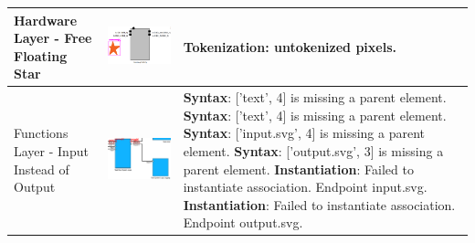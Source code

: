\begin{longtable}{p{} >{\raggedright\arraybackslash}m{} >{\raggedright\arraybackslash}m{}}
    \midrule
    Hardware Layer - Free Floating Star & \includegraphics[width=1\linewidth]{pictures/43_free_floating_star_output_clip.png} & \textbf{Tokenization}: untokenized pixels. \\
    \midrule
    Functions Layer - Input Instead of Output & \includegraphics[width=1\linewidth]{pictures/50_input_instead_of_output_output_clip.png} & \textbf{Syntax}: ['text', 4] is missing a parent element. \newline
        \textbf{Syntax}: ['text', 4] is missing a parent element. \newline
        \textbf{Syntax}: ['input.svg', 4] is missing a parent element. \newline
        \textbf{Syntax}: ['output.svg', 3] is missing a parent element. \newline
        \textbf{Instantiation}: Failed to instantiate association. Endpoint input.svg. \newline
        \textbf{Instantiation}: Failed to instantiate association. Endpoint output.svg. \newline

\end{longtable}
